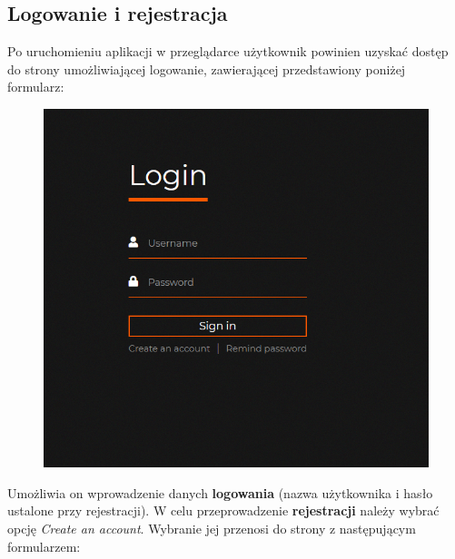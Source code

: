 \documentclass[12pt] {article}
\begin{document}
\subsection{Logowanie i rejestracja}
Po uruchomieniu aplikacji w przeglądarce użytkownik powinien uzyskać dostęp do strony umożliwiającej logowanie, zawierającej przedstawiony poniżej formularz:
\begin{figure}[H]
\centering
\includegraphics[scale=0.5]{res/2_logowanie}
\end{figure}
Umożliwia on wprowadzenie danych \textbf{logowania} (nazwa użytkownika i hasło ustalone przy rejestracji). W celu przeprowadzenie \textbf{rejestracji} należy wybrać opcję \emph{Create an account}. Wybranie jej przenosi do strony z następującym formularzem:
\end{document}
